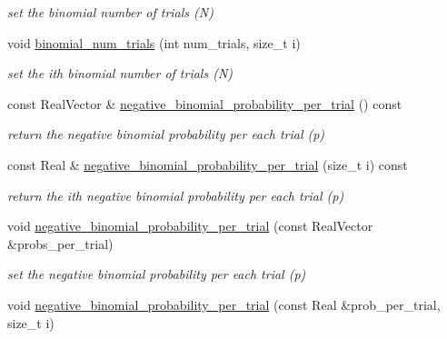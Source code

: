 \begin{DoxyCompactItemize}
\begin{DoxyCompactList}\small\item\em set the binomial number of trials (N) \end{DoxyCompactList}\item 
void \hyperlink{classPecos_1_1AleatoryDistParams_abb789dbd35e9254f0b4311c300cecc2b}{binomial\+\_\+num\+\_\+trials} (int num\+\_\+trials, size\+\_\+t i)\label{classPecos_1_1AleatoryDistParams_abb789dbd35e9254f0b4311c300cecc2b}

\begin{DoxyCompactList}\small\item\em set the ith binomial number of trials (N) \end{DoxyCompactList}\item 
const Real\+Vector \& \hyperlink{classPecos_1_1AleatoryDistParams_a504d0fb2ef78a938bf7a35232e4f5bd0}{negative\+\_\+binomial\+\_\+probability\+\_\+per\+\_\+trial} () const \label{classPecos_1_1AleatoryDistParams_a504d0fb2ef78a938bf7a35232e4f5bd0}

\begin{DoxyCompactList}\small\item\em return the negative binomial probability per each trial (p) \end{DoxyCompactList}\item 
const Real \& \hyperlink{classPecos_1_1AleatoryDistParams_a445f8c9bc5a143f58ef5cc88a2831274}{negative\+\_\+binomial\+\_\+probability\+\_\+per\+\_\+trial} (size\+\_\+t i) const \label{classPecos_1_1AleatoryDistParams_a445f8c9bc5a143f58ef5cc88a2831274}

\begin{DoxyCompactList}\small\item\em return the ith negative binomial probability per each trial (p) \end{DoxyCompactList}\item 
void \hyperlink{classPecos_1_1AleatoryDistParams_a2e09bf42eea8eb7e05842f25f27f8a07}{negative\+\_\+binomial\+\_\+probability\+\_\+per\+\_\+trial} (const Real\+Vector \&probs\+\_\+per\+\_\+trial)\label{classPecos_1_1AleatoryDistParams_a2e09bf42eea8eb7e05842f25f27f8a07}

\begin{DoxyCompactList}\small\item\em set the negative binomial probability per each trial (p) \end{DoxyCompactList}\item 
void \hyperlink{classPecos_1_1AleatoryDistParams_ada012f55e7c9e3fd690c38719eafa928}{negative\+\_\+binomial\+\_\+probability\+\_\+per\+\_\+trial} (const Real \&prob\+\_\+per\+\_\+trial, size\+\_\+t i)\label{classPecos_1_1AleatoryDistParams_ada012f55e7c9e3fd690c38719eafa928}


\end{DoxyCompactItemize}
